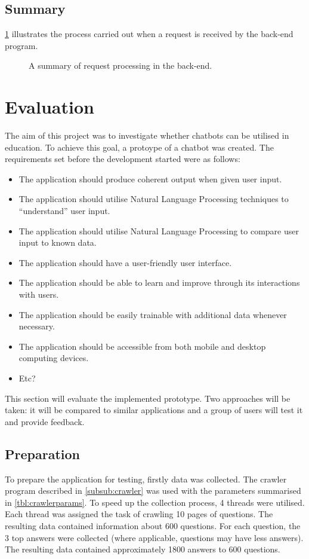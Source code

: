 \documentclass[12pt,a4paper]{article}
\newcommand{\captionstyle}[1] {
    \small{#1}
}
\begin{document}
\subsection{Summary}
\cref{fig:requestflow} illustrates the process carried out when a request is received by the back-end program.

\begin{figure}[htb]
	\centering
	\def\svgscale{0.7}
	\def\svgwidth{\columnwidth}
	
	\caption{\captionstyle{A summary of request processing in the back-end.}}
	\label{fig:requestflow}
\end{figure}


\clearpage
\section{Evaluation}
The aim of this project was to investigate whether chatbots can be utilised in education. To achieve this goal, a protoype of a chatbot was created. The requirements set before the development started were as follows:
\begin{itemize}
    \item The application should produce coherent output when given user input.
    \item The application should utilise Natural Language Processing techniques to “understand” user input.
    \item The application should utilise Natural Language Processing to compare user input to known data.
    \item The application should have a user-friendly user interface.
    \item The application should be able to learn and improve through its interactions with users.
    \item The application should be easily trainable with additional data whenever necessary.
    \item The application should be accessible from both mobile and desktop computing devices.
    \item Etc?
\end{itemize}

This section will evaluate the implemented prototype. Two approaches will be taken: it will be compared to similar applications and a group of users will test it and provide feedback.

\subsection{Preparation}\label{subsec:prep}
To prepare the application for testing, firstly data was collected. The crawler program described in \cref{subsub:crawler} was used with the parameters summarised in \cref{tbl:crawlerparams}. To speed up the collection process, 4 threads were utilised. Each thread was assigned the task of crawling 10 pages of questions. The resulting data contained information about 600 questions. For each question, the 3 top answers were collected (where applicable, questions may have less answers). The resulting data contained approximately 1800 answers to 600 questions.
\end{document}

